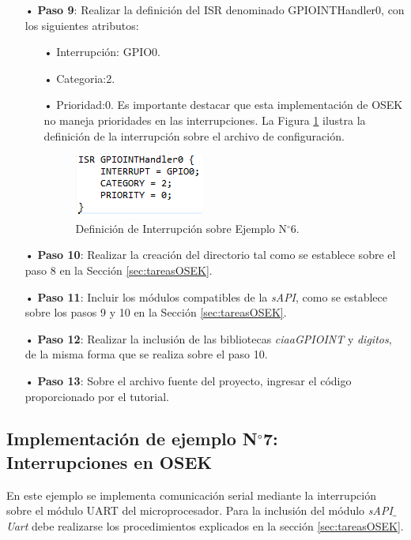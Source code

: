 \documentclass[12pt,letterpaper]{article}
\begin{document}
\begin{enumerate}
\item[•]\textbf{Paso 9}: Realizar la definición del ISR denominado GPIOINTHandler0, con los siguientes atributos:
\begin{enumerate}
\item[•]Interrupción: GPIO0.
\item[•]Categoria:2.
\item[•]Prioridad:0. Es importante destacar que esta implementación de OSEK no maneja prioridades en las interrupciones. La Figura \ref{defintej6} ilustra la definición de la interrupción sobre el archivo de configuración.
\begin{figure}[H]
\centering
\includegraphics[width=5 cm]{figuras/f34.png}
\caption{Definición de Interrupción sobre Ejemplo N$^{\circ}$6.}
\label{defintej6}
\end{figure}
\end{enumerate}
\item[•]\textbf{Paso 10}: Realizar la creación del directorio tal como se establece sobre el paso 8 en la Sección \ref{sec:tareasOSEK}.
\item[•]\textbf{Paso 11}: Incluir los módulos compatibles de la \textit{sAPI}, como se establece sobre los pasos 9 y 10 en la Sección \ref{sec:tareasOSEK}.
\item[•]\textbf{Paso 12}: Realizar la inclusión de las bibliotecas \textit{ciaaGPIOINT} y \textit{digitos}, de la misma forma que se realiza sobre el paso 10.
\item[•]\textbf{Paso 13}: Sobre el archivo fuente del proyecto, ingresar el código proporcionado por el tutorial.

\end{enumerate}


\subsection{Implementación de ejemplo N$^{\circ}$7: Interrupciones en OSEK}

En este ejemplo se implementa comunicación serial mediante la interrupción sobre el módulo UART del microprocesador. Para la inclusión del módulo \textit{sAPI$\_$Uart} debe realizarse los procedimientos explicados en la sección \ref{sec:tareasOSEK}. 
 \\
 
\end{document}
